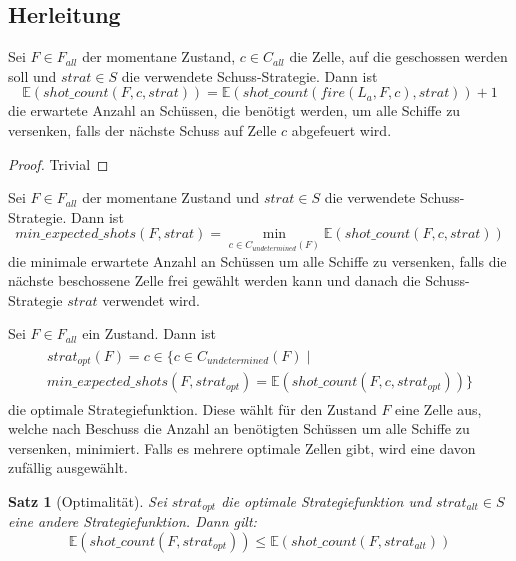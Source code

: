 \documentclass[a4paper,12pt]{llncs}
\numberwithin{equation}{section}
\newtheorem{satz}{Satz}
\begin{document}
\subsection{Herleitung}

\begin{lemma}
Sei $F\in F_{all}$ der momentane Zustand, $c\in C_{all}$ die Zelle, auf die geschossen werden soll und $strat \in S$ die verwendete Schuss-Strategie.
Dann ist
\[
\mathds{E}(shot\_count(F, c, strat))=\mathds{E}(shot\_count(fire(L_a, F, c), strat)) + 1
\]
die erwartete Anzahl an Schüssen, die benötigt werden, um alle Schiffe zu versenken, falls der nächste Schuss auf Zelle $c$ abgefeuert wird.
\end{lemma}

\begin{proof}
Trivial
\end{proof}

\begin{definition}
Sei $F\in F_{all}$ der momentane Zustand und $strat \in S$ die verwendete Schuss-Strategie.
Dann ist
\[
min\_expected\_shots(F, strat)=\min_{c \in C_{undetermined}(F)} \mathds{E}(shot\_count(F, c, strat))
\]
die minimale erwartete Anzahl an Schüssen um alle Schiffe zu versenken, falls die nächste beschossene Zelle frei gewählt werden kann und danach die Schuss-Strategie $strat$ verwendet wird.
\end{definition}

\begin{definition}
Sei $F\in F_{all}$ ein Zustand.
Dann ist
\begin{align}
\begin{split}
strat_{opt}(F)=c \in \{c \in C_{undetermined}(F) \mid \\
min\_expected\_shots(F, strat_{opt})= \mathds{E}(shot\_count(F, c, strat_{opt}))\}
\end{split}
\end{align}
die optimale Strategiefunktion.
Diese wählt für den Zustand $F$ eine Zelle aus, welche nach Beschuss die Anzahl an benötigten Schüssen um alle Schiffe zu versenken, minimiert. Falls es mehrere optimale Zellen gibt, wird eine davon zufällig ausgewählt.
\end{definition}

\begin{satz}[Optimalität]
Sei $strat_{opt}$ die optimale Strategiefunktion und $strat_{alt} \in S$ eine andere Strategiefunktion.
Dann gilt:
\[
\mathds{E}(shot\_count(F, strat_{opt})) \leq \mathds{E}(shot\_count(F, strat_{alt}))
\]
\end{satz}
\end{document}
